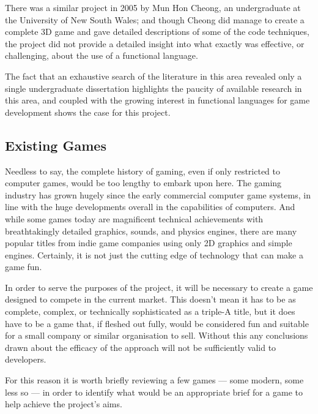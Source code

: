 There was a similar project in 2005 by Mun Hon Cheong, an undergraduate at the University of New South Wales;\cite{cheong2005functional} and though Cheong did manage to create a complete 3D game and gave detailed descriptions of some of the code techniques, the project did not provide a detailed insight into what exactly was effective, or challenging, about the use of a functional language.

The fact that an exhaustive search of the literature in this area revealed only a single undergraduate dissertation highlights the paucity of available research in this area, and coupled with the growing interest in functional languages for game development shows the case for this project.

\subsection{Existing Games}

Needless to say, the complete history of gaming, even if only restricted to computer games, would be too lengthy to embark upon here. The gaming industry has grown hugely since the early commercial computer game systems, in line with the huge developments overall in the capabilities of computers. And while some games today are magnificent technical achievements with breathtakingly detailed graphics, sounds, and physics engines, there are many popular titles from indie game companies using only 2D graphics and simple engines. Certainly, it is not just the cutting edge of technology that can make a game fun.

In order to serve the purposes of the project, it will be necessary to create a game designed to compete in the current market. This doesn't mean it has to be as complete, complex, or technically sophisticated as a triple-A title, but it does have to be a game that, if fleshed out fully, would be considered fun and suitable for a small company or similar organisation to sell. Without this any conclusions drawn about the efficacy of the approach will not be sufficiently valid to developers.

For this reason it is worth briefly reviewing a few games --- some modern, some less so --- in order to identify what would be an appropriate brief for a game to help achieve the project's aims.



